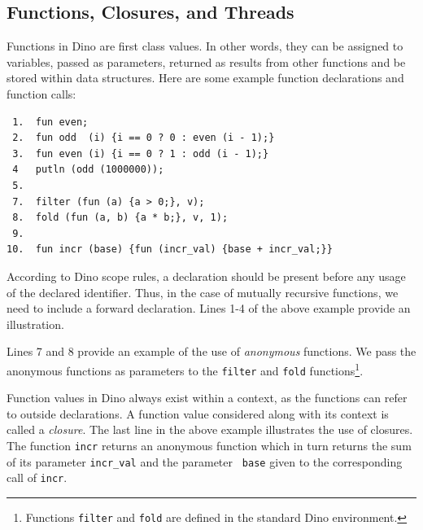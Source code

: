 \documentclass[preprint]{sigplanconf}
\begin{document}
\subsection{Functions, Closures, and Threads}

  Functions in Dino are first class values.  In other words, they
can be assigned to variables, passed as parameters, returned as
results from other functions and be stored within data structures.  Here
are some example function declarations and function calls:

{\footnotesize
\begin{verbatim}
 1.  fun even;
 2.  fun odd  (i) {i == 0 ? 0 : even (i - 1);}
 3.  fun even (i) {i == 0 ? 1 : odd (i - 1);}
 4   putln (odd (1000000));
 5.
 7.  filter (fun (a) {a > 0;}, v);
 8.  fold (fun (a, b) {a * b;}, v, 1);
 9.
10.  fun incr (base) {fun (incr_val) {base + incr_val;}}
\end{verbatim}
}

According to Dino scope rules, a declaration should be present before any usage of the
declared identifier. Thus, in the case of mutually recursive functions, we need to include
a forward declaration. Lines 1-4 of the above example provide an illustration.

Lines 7 and 8 provide an example of the use of \emph{anonymous} functions.  We pass
the anonymous functions as parameters to the {\tt filter}
and {\tt fold} functions\footnote{Functions {\tt filter} and {\tt fold} are defined in the standard
Dino environment.}.

Function values in Dino always exist within a context, as the
functions can refer to outside declarations. A function value considered along with its
context is called a \emph{closure}. The last line in the above example
illustrates the use of closures.  The function {\tt incr} returns an anonymous
function which in turn returns the sum of its parameter {\tt incr\_val} and the parameter {\tt
base} given to the corresponding call of {\tt incr}.
\end{document}
